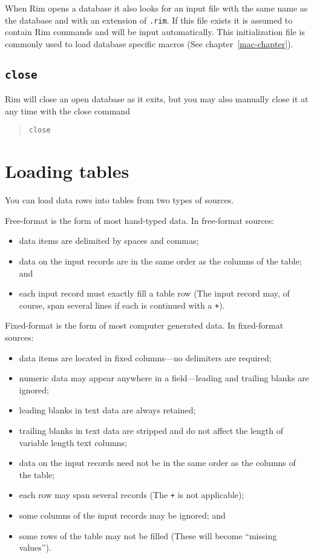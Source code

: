 \documentclass[11pt,a4paper]{report}
\begin{document}
When Rim opens a database it also looks for an input
file with the same name as the database and with an extension
of \verb!.rim!.  If this file exists it is assumed to contain
Rim commands and will be input automatically.
This initialization file is commonly used to load
database specific macros (See chapter~\ref{mac-chapter}).
 
\subsection{{\tt close}}
Rim will close an open database as it exits, but you
may also manually close it at any time with the close
command
\begin{verse}
  \verb|close|
\end{verse}
 
 
\section{Loading tables}
%
You can load data rows into tables from two types of sources.
 
\begin{List}
\item[Free-format] is the form of most hand-typed data.
  In free-format sources:
  \begin{itemize}
  \item data items are delimited by spaces and commas;
  \item data on the input records are in the same order as
     the columns of the table; and
  \item each input record must exactly fill a table row (The
     input record may, of course, span several lines if each
     is continued with a \verb!+!).
  \end{itemize}
\item[Fixed-format] is the form of most computer generated data.
  In fixed-format sources:
  \begin{itemize}
  \item data items are located in fixed columns---no delimiters
     are required;
  \item numeric data may appear anywhere in a field---leading and
     trailing blanks are ignored;
  \item leading blanks in text data are always retained;
  \item trailing blanks in text data are stripped and do not
     affect the length of variable length text columns;
  \item data on the input records need not be in the same order as
     the columns of the table;
  \item each row may span several records (The \verb!+! is not applicable);
  \item some columns of the input records may be ignored;   and
  \item some rows of the table may not be filled (These will become
     ``missing values'').
  \end{itemize}
\end{List}
 
\end{document}
